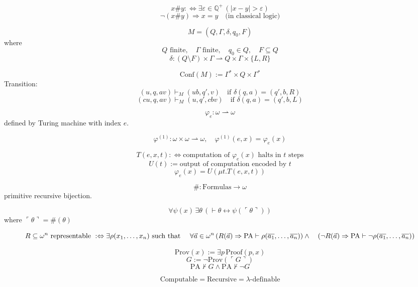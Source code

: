 \documentclass{article}
\begin{document}
\[
x \# y :\Leftrightarrow \exists \varepsilon \in \mathbb{Q}^+ \, (|x - y| > \varepsilon)
\]
\[
\neg(x \# y) \Rightarrow x = y \quad \text{(in classical logic)}
\]

\[
M = (Q, \Gamma, \delta, q_0, F)
\]
where
\[
Q \text{ finite}, \quad \Gamma \text{ finite}, \quad q_0 \in Q, \quad F \subseteq Q
\]
\[
\delta : (Q \setminus F) \times \Gamma \rightharpoonup Q \times \Gamma \times \{L, R\}
\]

\[
\text{Conf}(M) := \Gamma^* \times Q \times \Gamma^*
\]
Transition:
\[
(u, q, a v) \vdash_M (u b, q', v) \quad \text{if } \delta(q, a) = (q', b, R)
\]
\[
(c u, q, a v) \vdash_M (u, q', c b v) \quad \text{if } \delta(q, a) = (q', b, L)
\]

\[
\varphi_e : \omega \rightharpoonup \omega
\]
defined by Turing machine with index $e$.

\[
\varphi^{(1)} : \omega \times \omega \rightharpoonup \omega, \quad \varphi^{(1)}(e, x) = \varphi_e(x)
\]

\[
T(e, x, t) :\Leftrightarrow \text{computation of } \varphi_e(x) \text{ halts in } t \text{ steps}
\]
\[
U(t) := \text{output of computation encoded by } t
\]
\[
\varphi_e(x) = U(\mu t . T(e, x, t))
\]

\[
\# : \text{Formulas} \to \omega
\]
primitive recursive bijection.

\[
\forall \psi(x) \, \exists \theta \, (\vdash \theta \leftrightarrow \psi(\ulcorner \theta \urcorner))
\]
where $\ulcorner \theta \urcorner = \#(\theta)$

\[
R \subseteq \omega^n \text{ representable } :\Leftrightarrow \exists \rho(x_1, \dots, x_n) \text{ such that } \\
\quad \forall \vec{a} \in \omega^n \, (R(\vec{a}) \Rightarrow \text{PA} \vdash \rho(\overline{a_1}, \dots, \overline{a_n})) \land \\
\quad (\neg R(\vec{a}) \Rightarrow \text{PA} \vdash \neg \rho(\overline{a_1}, \dots, \overline{a_n}))
\]

\[
\text{Prov}(x) := \exists p \, \text{Proof}(p, x)
\]
\[
G := \neg \text{Prov}(\ulcorner G \urcorner)
\]
\[
\text{PA} \nvdash G \land \text{PA} \nvdash \neg G
\]

\[
\text{Computable} = \text{Recursive} = \lambda\text{-definable}
\]
\end{document}

